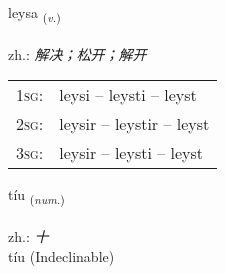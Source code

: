\documentclass[frontgrid, backgrid]{flacards}\usepackage[]{graphicx}\usepackage[]{xcolor}
\begin{document}
\renewcommand{\flhead}{\vskip5pt \fboxsep=0pt {\small\bfseries\footnotesize Sagnorð | 动词}}
\renewcommand{\fcfoot}{\vskip5pt \fboxsep=0pt \hspace{2pt}{\small\bfseries\footnotesize 1K}}

\renewcommand{\blhead}{\vskip5pt {\small\bfseries\footnotesize Sagnorð | 动词 }}
\renewcommand{\bcfoot}{\vskip5pt \hspace{2pt}{\small\bfseries\footnotesize 1K}}


{leysa \small{\textsubscript{(\textit{v.})}} \\[1ex] %
\textphonetic{[leiːsa]} \\
zh.: \emph{解决；松开；解开} \\  [2ex]
\renewcommand*{\arraystretch}{0.8}
\begin{tabular}{p{1cm}l}
\textsc{1sg}: & leysi -- leysti -- leyst \\ 
\textsc{2sg}: & leysir -- leystir -- leyst \\ 
\textsc{3sg}: & leysir -- leysti -- leyst \\ 
\end{tabular}
}


\renewcommand{\flhead}{\vskip5pt \fboxsep=0pt {\small\bfseries\footnotesize Töluorð | 数量词}}
\renewcommand{\fcfoot}{\vskip5pt \fboxsep=0pt \hspace{2pt}{\small\bfseries\footnotesize 1K}}

\renewcommand{\blhead}{\vskip5pt {\small\bfseries\footnotesize Töluorð | 数量词 }}
\renewcommand{\bcfoot}{\vskip5pt \hspace{2pt}{\small\bfseries\footnotesize 1K}}


{tíu \small{\textsubscript{(\textit{num.})}} \\[1ex]
\textphonetic{[tʰijʏ]} \\
zh.: \emph{十} \\  [2ex]
tíu (Indeclinable)}

\renewcommand{\flhead}{\vskip5pt \fboxsep=0pt {\small\bfseries\footnotesize Lýsingarorð | 形容词}}
\renewcommand{\fcfoot}{\vskip5pt \fboxsep=0pt \hspace{2pt}{\small\bfseries\footnotesize 1K}}
\end{document}
